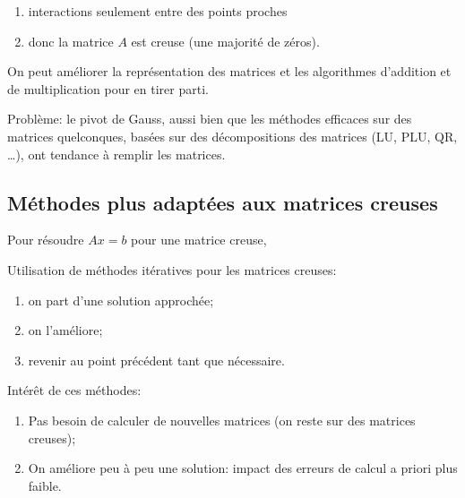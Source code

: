 \begin{enumerate}
\item interactions seulement entre des points proches
\item donc la matrice $A$ est creuse (une majorité de zéros).
\end{enumerate}

On peut améliorer la représentation des matrices et les algorithmes
d'addition et de multiplication pour en tirer parti.

Problème: le pivot de Gauss, aussi bien que les méthodes
\og{}efficaces\fg{} sur des matrices quelconques, basées sur des
décompositions des matrices  (LU, PLU, QR, \ldots{}), ont tendance à
remplir les matrices.

\subsection{Méthodes plus adaptées aux matrices creuses}

Pour résoudre $Ax=b$ pour une matrice creuse,

Utilisation de méthodes itératives pour les matrices creuses:
\begin{enumerate}
\item on part d'une solution approchée;
\item on l'améliore;
\item revenir au point précédent tant que nécessaire.
\end{enumerate}
 
Intérêt de ces méthodes:
\begin{enumerate}
\item Pas besoin de calculer de nouvelles matrices (on reste sur des
  matrices creuses);
\item On améliore peu à peu une solution: impact des erreurs de calcul
  a priori plus faible.
\end{enumerate}





 

